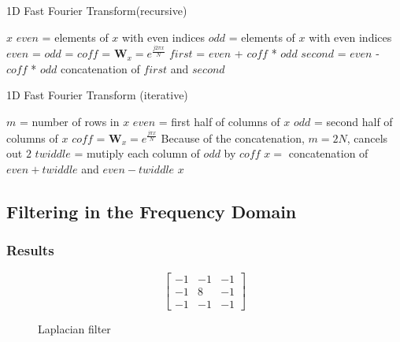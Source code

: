 \documentclass{article}
\begin{document}
\begin{algorithm}[H]
\caption{1D Fast Fourier Transform(recursive)}
  \begin{algorithmic}[1]
         \Return $x$
      \Else
         \State $even$ = elements of $x$ with even indices
         \State $odd$ = elements of $x$ with even indices
         \State $even$ = 
         \State $odd$ = 
         \State $coff$ = $\mathbf{W}_{x} = e^{\frac{j2\pi x}{N}}$
         \State $first$ = $even$ + $coff$ * $odd$
         \State $second$ = $even$ - $coff$ * $odd$
         \State \Return concatenation of $first$ and $second$
      \EndIf
    \EndFunction
  \end{algorithmic}
\end{algorithm}

\begin{algorithm}[H]
\caption{1D Fast Fourier Transform (iterative)}
  \begin{algorithmic}[1]
         \State $m$ = number of rows in $x$
         \State $even$ = first half of columns of $x$
         \State $odd$ = second half of columns of $x$
         \State $coff$ = $\mathbf{W}_{x} = e^{\frac{j\pi x}{N}}$
         \Comment Because of the concatenation, $m = 2N$, cancels out $2$
         \State $twiddle$ = mutiply each column of $odd$ by $coff$
         \State $x =$ concatenation of $even + twiddle$ and $even -  twiddle$
      \EndWhile
      \State\Return $x$
    \EndFunction
  \end{algorithmic}
\end{algorithm}

\subsection{Filtering in the Frequency Domain}

\subsubsection{Results}

\begin{figure}[H]
	\centering
		\[ \begin{bmatrix}
			-1 & -1 & -1 \\
			-1 &  8 & -1 \\
			-1 & -1 & -1
		\end{bmatrix} \]
\caption{Laplacian filter}
\end{figure}
\end{document}
